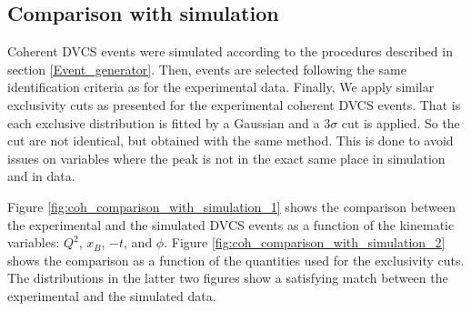 \subsection{Comparison with simulation}
Coherent DVCS events were simulated according to the procedures described 
in section \ref{Event_generator}. Then, events are selected following the same 
identification criteria as for the experimental data. Finally, We apply similar 
exclusivity cuts as presented for the experimental coherent DVCS events. That 
is each exclusive distribution is fitted by a Gaussian and a 3$\sigma$ cut is 
applied. So the cut are not identical, but obtained with the same method. This 
is done to avoid issues on variables where the peak is not in the exact same 
place in simulation and in data.

Figure \ref{fig:coh_comparison_with_simulation_1} shows the comparison between 
the experimental and the simulated DVCS events as a function of the kinematic 
variables: $Q^{2}$, $x_{B}$, $-t$, and $\phi$. Figure 
\ref{fig:coh_comparison_with_simulation_2} shows the comparison as a function 
of the quantities used for the exclusivity cuts. The distributions in the 
latter two figures show a satisfying match between the experimental and the 
simulated data.
